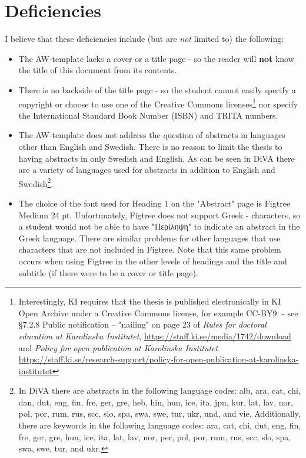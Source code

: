 \documentclass[12pt, twoside]{article}
\begin{document}
\section{Deficiencies}
I believe that these deficiencies include (but are \textit{not} limited to) the following:
\begin{itemize}[label=\color{red}]
  \item The AW-template lacks a cover or a title page - so the reader will \textbf{not} know the title of this document from its contents.
  
\item There is no backside of the title page - so the student cannot easily specify a copyright or choose to use one of the Creative Commons licenses\footnote{Interestingly, KI requires that the thesis is published
electronically in KI Open Archive under a Creative Commons license, for example CC-BY9. - see  §7.2.8 Public notification – "nailing" on page 23 of \textit{Rules for doctoral education at Karolinska Institutet}, \url{https://staff.ki.se/media/1742/download} and \textit{Policy for open publication at Karolinska Institutet} \url{https://staff.ki.se/research-support/policy-for-open-publication-at-karolinska-institutet}} nor specify the International Standard Book Number (ISBN) and TRITA numbers.

\item The AW-template does not address the question of abstracts in languages other than English and Swedish. There is no reason to limit the thesis to having abstracts in only Swedish and English. As can be seen in \gls{DiVA} there are a variety of languages used for abstracts in addition to English and Swedish\footnote{In DiVA there are abstracts in the following language codes: alb, ara, cat, chi, dan, dut, eng, fin, fre, ger, gre, heb, hin, hun, ice, ita, jpn, kur, lat, lav, nor, pol, por, rum, rus, scc, slo, spa, swa, swe, tur, ukr, und, and vie. Additionally, there are keywords in the following language codes: ara, cat, chi, dut, eng, fin, fre, ger, gre, hun, ice, ita, lat, lav, nor, per, pol, por, rum, rus, scc, slo, spa, swa, swe, tur, and ukr.}{}.

\item The choice of the font used for Heading 1 on the "Abstract" page is Figtree Medium 24 pt. Unfortunately, Figtree does not support Greek - characters, so a student would not be able to have "{\NotoSansFont Περίληψη}" to indicate an abstract in the Greek language. There are similar problems for other languages that use characters that are not included in Figtree. Note that this same problem occurs when using Figtree in the other levels of headings and the title and subtitle (if there were to be a cover or title page).
\end{itemize}
\end{document}
